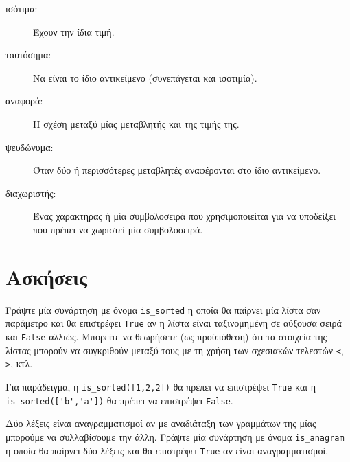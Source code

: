 \documentclass[10pt]{book}
\begin{document}
\begin{description}
\item[ισότιμα:] Έχουν την ίδια τιμή.

\item[ταυτόσημα:] Να είναι το ίδιο αντικείμενο (συνεπάγεται και ισοτιμία).

\item[αναφορά:] Η σχέση μεταξύ μίας μεταβλητής και της τιμής της.

\item[ψευδώνυμα:] Όταν δύο ή περισσότερες μεταβλητές αναφέρονται στο ίδιο αντικείμενο.

\item[διαχωριστής:] Ένας χαρακτήρας ή μία συμβολοσειρά που χρησιμοποιείται για να υποδείξει που πρέπει να χωριστεί μία συμβολοσειρά.

\end{description}


\section{Ασκήσεις}

\begin{exercise}
Γράψτε μία συνάρτηση με όνομα \verb"is_sorted" η οποία θα παίρνει μία λίστα σαν παράμετρο και θα επιστρέφει {\tt True} αν η λίστα είναι ταξινομημένη σε αύξουσα σειρά και {\tt False} αλλιώς. Μπορείτε να θεωρήσετε (ως προϋπόθεση) ότι τα στοιχεία της λίστας μπορούν να συγκριθούν μεταξύ τους με τη χρήση των σχεσιακών τελεστών {\tt <}, {\tt >}, κτλ.

Για παράδειγμα, η \verb"is_sorted([1,2,2])" θα πρέπει να επιστρέψει {\tt True}  και η \verb"is_sorted(['b','a'])" θα πρέπει να επιστρέψει {\tt False}.
\\
\end{exercise}
 

\begin{exercise}
\label{anagram}

Δύο λέξεις είναι αναγραμματισμοί αν με αναδιάταξη των γραμμάτων της μίας μπορούμε να συλλαβίσουμε την άλλη. Γράψτε μία συνάρτηση με όνομα \verb"is_anagram" η οποία θα παίρνει δύο λέξεις και θα επιστρέφει 
{\tt True} αν είναι αναγραμματισμοί.
\\
\end{exercise}
\end{document}
